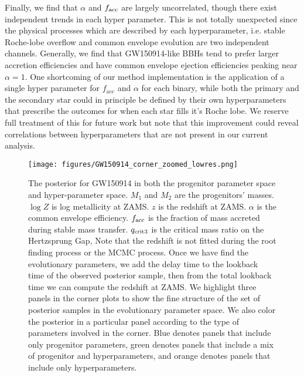 \documentclass[twocolumn]{aastex631}
\newcommand{\kw}[1]{{\color{rb4}[KW: #1 ]}}
\newcommand{\kb}[1]{\textcolor{pink}{#1}}
\begin{document}
Finally, we find that $\alpha$ and $f_{\rm acc}$ are largely uncorrelated,
though there exist independent trends in each hyper parameter. This is not
totally unexpected since the physical processes which are described by each
hyperparameter, i.e. stable Roche-lobe overflow and common envelope evolution
are two independent channels. Generally, we find that GW150914-like BBHs tend to
prefer larger accretion efficiencies and have common envelope ejection
efficiencies peaking near $\alpha=1$. One shortcoming of our method
implementation is the application of a single hyper parameter for
$f_{\mathrm{acc}}$ and $\alpha$ for each binary, while both the primary and the
secondary star could in principle be defined by their own hyperparameters that
prescribe the outcomes for when each star fills it's Roche lobe. We reserve full
treatment of this for future work but note that this improvement could reveal
correlations between hyperparameters that are not present in our current
analysis.

\begin{figure*}[h]
    \texttt{[image: figures/GW150914\_corner\_zoomed\_lowres.png]}
    \caption{The posterior for GW150914 in both the progenitor parameter space and hyper-parameter space.
    $M_1$ and $M_2$ are the progenitors' masses. $\log{Z}$ is log metallicity at ZAMS.
    $z$ is the redshift at ZAMS. 
    $\alpha$ is the common envelope efficiency.
    $f_{\rm acc}$ is the fraction of mass accreted during stable mass transfer.
    $q_{\rm crit 3}$ is the critical mass ratio on the Hertzsprung Gap,
    Note that the redshift is not fitted during the root finding process or the MCMC process.
    Once we have find the evolutionary parameters, we add the delay time to the lookback time of the observed posterior sample,
    then from the total lookback time we can compute the redshift at ZAMS.
    We highlight three panels in the corner plots to show the fine structure of the set of posterior samples in the evolutionary parameter space.
    We also color the posterior in a particular panel according to the type of parameters involved in the corner.
    Blue denotes panels that include only progenitor parameters,
    green denotes panels that include a mix of progenitor and hyperparameters,
    and orange denotes panels that include only hyperparameters.
    }
    \label{fig:GW150914_posterior}
\end{figure*}
\end{document}
